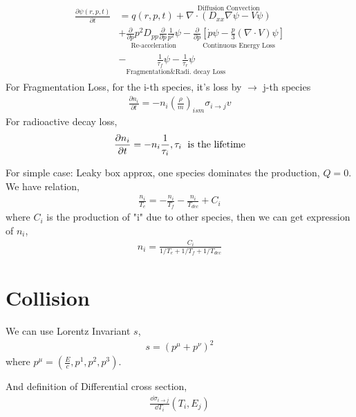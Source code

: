 \documentclass{sciposter}
\begin{document}
\begin{multicols}{3}
\begin{align}
    \begin{aligned}
      \frac{\partial \psi(r,p,t)}{\partial t}&=q(r,p,t)+\overset{\text{Diffusion Convection}}{\nabla\cdot (D_{xx}\nabla \psi-V\psi )}\\
      &+\underset{\text{Re-acceleration}}{\frac{\partial  }{\partial p}p^{2}D_{pp}\frac{\partial }{\partial p}\frac{1}{p^{2} }\psi  }-\underset{\text{Continuous Energy Loss}}{\frac{\partial }{\partial p}\left[\dot{p}\psi-\frac{p}{3}(\nabla\cdot V)\psi\right]}\\
      &-\underset{\text{Fragmentation\& Radi. decay Loss}}{\frac{1}{\tau_{f} }\psi-\frac{1}{\tau_{r} }\psi}
    \end{aligned}
\end{align}
For Fragmentation Loss, for the i-th species, it's loss by $\rightarrow$ j-th species 
\begin{align}
    \frac{\partial n_{i} }{\partial t}=-n_{i}(\frac{\rho}{m})_{ism}\sigma_{i\rightarrow j}v   
\end{align}
 For radioactive decay loss,
 \begin{align}
     \frac{\partial n_{i} }{\partial t}=-n_{i}\frac{1}{\tau_{i} }, \tau_{i} \text{\; is the lifetime}  
 \end{align}

For simple case: Leaky box approx, one species dominates the production, $Q=0$. We have relation,
\begin{align}
    \frac{n_{i} }{T_{e} }=-\frac{n_{i} }{T_{f} }-\frac{n_{i} }{T_{dec} }+C_{i} 
\end{align}
where $C_{i} $ is the production of "i" due to other species, then we can get expression of $n_{i} $,
\begin{align}
    n_{i}=\frac{C_{i} }{1/T_{e}+1/T_{f}+1/T_{dec}   } 
\end{align}

\section{Collision}

We can use Lorentz Invariant $s$,
\begin{align}
    s=(p^{\mu}+p^{\nu}  )^{2} 
\end{align}
where $p^{\mu}=(\frac{E}{c},p^{1},p^{2},p^{3}   ) $.

And definition of Differential cross section,
\begin{align}
    \frac{\dd{\sigma_{i\rightarrow j} }}{\dd{T_{i} }}(T_{i},E_{j}  )
\end{align}


\end{multicols}
\end{document}
